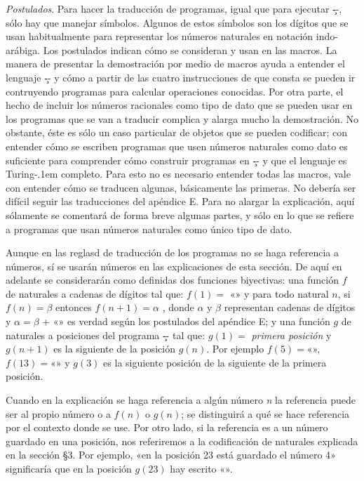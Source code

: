 {\it Postulados}. Para hacer la traducción de programas, igual que para ejecutar \c--, sólo hay que
manejar símbolos. Algunos de estos símbolos son los dígitos que se usan habitualmente para
representar los números naturales en notación indo-arábiga. Los postulados indican cómo se consideran
y usan en las macros.
\finlista
{}%
La manera de presentar la demostración por medio de macros ayuda a entender el lenguaje \c-- y cómo
a partir de las cuatro instrucciones de que consta se pueden ir contruyendo programas para calcular
operaciones conocidas. Por otra parte, el hecho de incluir los números racionales como tipo de dato
que se pueden usar en los programas que se van a traducir complica y alarga mucho la
demostración. No obstante, éste es sólo un caso particular de objetos que se pueden codificar; con
entender cómo se escriben programas que usen números naturales como dato es suficiente para
comprender cómo construir programas en \c-- y que el lenguaje es Turing-\kern.1em completo. Para
esto no es necesario entender todas las macros, vale con entender cómo se traducen algunas,
básicamente las primeras. No debería ser difícil seguir las traducciones del apéndice E. Para no
alargar la explicación, aquí sólamente se comentará de forma breve algunas partes, y sólo en lo que
se refiere a programas que usan números naturales como único tipo de dato.

Aunque en las reglasd de traducción de los programas no se haga referencia a números, sí se usarán
números en las explicaciones de esta sección. De aquí en adelante se considerarán como definidas dos
funciones biyectivas: una función $ f $ de naturales a cadenas de dígitos tal que: $ f(1)= $
«» y para todo natural $ n $, si $ f(n)=\beta $ entonces $ f(n+1)=\alpha $ , donde
$ \alpha $ y $ \beta $ representan cadenas de dígitos y $ \alpha = \beta $ + «» es verdad
según los postulados del apéndice E; y una función $ g $ de naturales a posiciones del programa \c--
tal que: $ g(1)= $ {\it primera posición} y $ g(n+1)$ es la siguiente de la posición $ g(n)$. Por
ejemplo $ f(5)= $«{}», $ f(13)=$«{}» y $g(3)$ es la siguiente posición de la
siguiente de la primera posición.

Cuando en la explicación se haga referencia a algún número {\it n} la referencia puede ser al propio
número o a $f(n)$ o $g(n)$; se distinguirá a qué se hace referencia por el contexto donde se
use. Por otro lado, si la referencia es a un número guardado en una posición, nos referiremos a la
codificación de naturales explicada en la sección §3. Por ejemplo, «en la posición 23 está
guardado el número 4» significaría que en la posición $g(23)$ hay escrito «».

